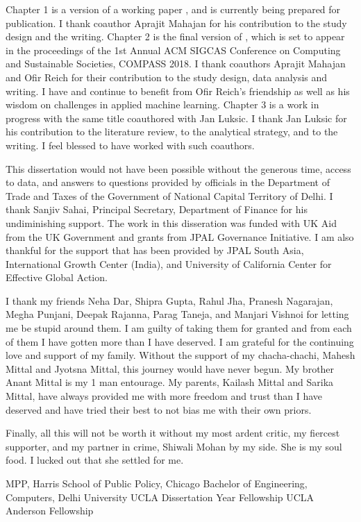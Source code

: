 {Chapter 1 is a version of a working paper \cite{mittal2017vat}, and is currently being prepared for publication. I thank coauthor Aprajit Mahajan for his contribution to the study design and the writing. Chapter 2 is the final version of \cite{mittal2018bogus}, which is set to appear in the proceedings of the 1st Annual ACM SIGCAS Conference on Computing and Sustainable Societies, COMPASS 2018. I thank coauthors Aprajit Mahajan and Ofir Reich for their contribution to the study design, data analysis and writing. I have and continue to benefit from Ofir Reich's friendship as well as his wisdom on challenges in applied machine learning. Chapter 3 is a work in progress with the same title coauthored with Jan Luksic. I thank Jan Luksic for his contribution to the literature review, to the analytical strategy, and to the writing. I feel blessed to have worked with such coauthors.

This dissertation would not have been possible without the generous time, access to data, and answers to questions provided by officials in the Department of Trade and Taxes of the Government of National Capital Territory of Delhi. I thank Sanjiv Sahai, Principal Secretary, Department of Finance for his undiminishing support. The work in this disseration was funded with UK Aid from the UK Government and grants from JPAL Governance Initiative. I am also thankful for the support that has been provided by JPAL South Asia, International Growth Center (India), and University of California Center for Effective Global Action.

I thank my friends Neha Dar, Shipra Gupta, Rahul Jha, Pranesh Nagarajan, Megha Punjani, Deepak Rajanna, Parag Taneja, and Manjari Vishnoi for letting me be stupid around them. I am guilty of taking them for granted and from each of them I have gotten more than I have deserved. I am grateful for the continuing love and support of my family. Without the support of my chacha-chachi, Mahesh Mittal and Jyotsna Mittal, this journey would have never begun. My brother Anant Mittal is my 1 man entourage. My parents, Kailash Mittal and Sarika Mittal, have always provided me with more freedom and trust than I have deserved and have tried their best to not bias me with their own priors. 

Finally, all this will not be worth it without my most ardent critic, my fiercest supporter, and my partner in crime, Shiwali Mohan by my side. She is my soul food. I lucked out that she settled for me.}
 {}
 {MPP, Harris School of Public Policy, Chicago}
 {Bachelor of Engineering, Computers, Delhi University}
 {}
 {UCLA Dissertation Year Fellowship}
 {UCLA Anderson Fellowship\vspace{0.8cm}}

